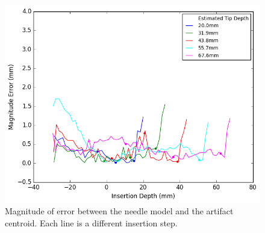 \begin{figure}[h]
\includegraphics[width=1.0\textwidth]{Fig/chap5/error_curve_3_var.png}
\caption{Magnitude of error between the needle model and the artifact centroid. Each line is a different insertion step.}
\label{fig:curve_errors_variable_spacing}
\end{figure}







